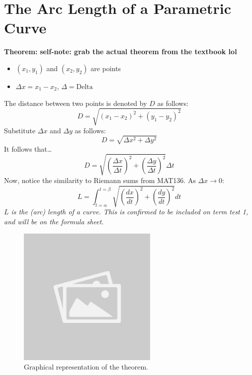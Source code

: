 \documentclass{article}
\begin{document}
\section*{The Arc Length of a Parametric Curve}
\begin{theorembox}
\textbf{Theorem:} \textbf{self-note: grab the actual theorem from the textbook lol}

\begin{itemize}
    \item \( (x_1, y_1) \) and \( (x_2, y_2) \) are points
    \item \( \Delta x = x_1 - x_2 \), \( \Delta = \text{Delta} \) 
\end{itemize}
The distance between two points is denoted by \( D \) as follows:
\[
    D = \sqrt{(x_1 - x_2)^2 + (y_1 - y_2)^2}
\]
Substitute \( \Delta x \) and \( \Delta y \) as follows:
\[
    D = \sqrt{\Delta x^2 + \Delta y^2} 
\]
It follows that\dots
\[
    D = \sqrt{(\frac{\Delta x}{\Delta t})^2 + (\frac{\Delta y}{\Delta t})^2 } \Delta t
\]
Now, notice the similarity to Riemann sums from MAT136. As \( \Delta x \to 0 \):
\[
    L = \int_{t=\alpha}^{t=\beta} \sqrt{(\frac{dx}{dt})^2 + (\frac{dy}{dt})^2} dt 
\]
\textit{\( L \) is the (arc) length of a curve. This is confirmed to be included on term test 1, and will be on the formula sheet.}

\end{theorembox}

\begin{figure}[H]
    \centering
    \includegraphics[width=0.6\textwidth]{sample_image1.jpg}
    \caption{Graphical representation of the theorem.}
    \label{fig:sample_image1}
\end{figure}
\end{document}
